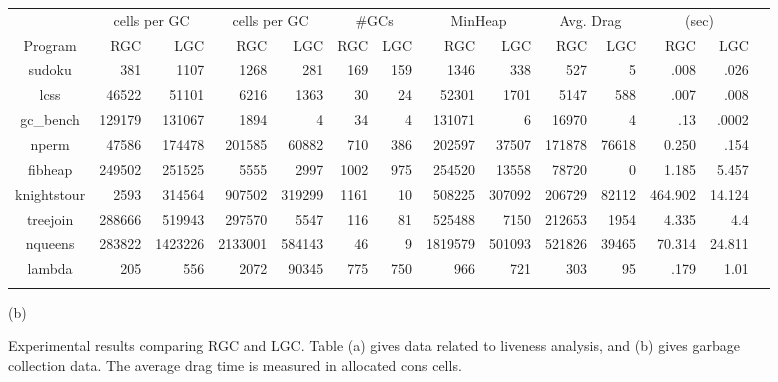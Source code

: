 \documentclass[9pt]{sigplanconf}
\begin{document}
\begin{figure}[t]
{\begin{tabular}{| c | r | r | r | r | r | r  |  r | r |
r | r | r | r | r |}
                            &   \multicolumn{2}{c|}{cells per GC}
                            &   \multicolumn{2}{c|}{cells per GC}
                            &   \multicolumn{2}{c|}{\#GCs}
                            &   \multicolumn{2}{c|}{MinHeap}
                            &   \multicolumn{2}{c|}{Avg. Drag}
                            &   \multicolumn{2}{c|}{(sec)} \\
\cline{2-13}
{Program}    &
RGC & LGC & RGC & LGC  & RGC & LGC  &   RGC & LGC & RGC & LGC & RGC &
LGC \\
\hline
\hline
    {\sf   sudoku}  &381 &1107 &1268 &281 &169 &159 & 1346  &338 &527 &5
&.008 & .026 \\
    {\sf  lcss } & 46522 &51101 &6216 &1363&30&24& 52301  &1701 &5147
&588 &.007 & .008 \\
    {\sf   gc\_bench}  &129179 &131067 &1894 &4&34&4& 131071   &6 &16970
 &4 &.13 & .0002 \\
     {\sf  nperm}  & 47586  &174478 &201585 &60882&710&386& 202597  &37507
&171878 &76618 &0.250 & .154  \\
    {\sf  fibheap} &249502  &251525 &5555 &2997&1002&975& 254520  &13558
&78720 &0 &1.185 & 5.457  \\
    {\sf  knightstour}  &2593 &314564 &907502 &319299&1161&10&508225
&307092 &206729 &82112 &464.902 & 14.124  \\
    {\sf  treejoin} & 288666  &519943 &297570 &5547&116&81& 525488  &7150
&212653 &1954 &4.335 & 4.4 \\
    {\sf   nqueens} & 283822 &1423226 &2133001 &584143&46&9& 1819579
&501093 &521826 &39465 &70.314 & 24.811 \\
    {\sf   lambda}  &205 & 556 &2072&90345 &775 &750&966 & 721  &303 &95
&.179 &1.01  \\
\\
 \hline
\end{tabular}}


\centerline{(b)}
\vskip -0.75mm
\caption{Experimental results comparing RGC and LGC. Table (a) gives
  data related to liveness analysis, and (b) gives garbage collection
  data. The average drag time is measured in allocated cons cells.}
\label{fig:experimental-results}
\normalsize
\end{figure}
\end{document}

